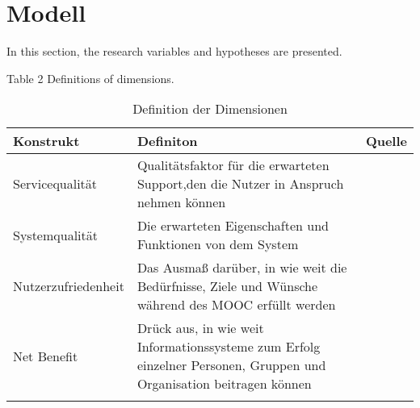 \section{Modell}
\label{sec:modell}

In this section, the research variables and hypotheses are presented.


Table 2
Definitions of dimensions.

\begin{table}[ht] 
\footnotesize
\caption{Definition der Dimensionen}
\label{tab:Dimensionen} 
\begin{tabular}{@{}lp{9cm}l@{}} \toprule

\textbf{Konstrukt} & \textbf{Definiton} & \textbf{Quelle} \\ \midrule



Servicequalität & Qualitätsfaktor für die erwarteten Support,den die Nutzer in Anspruch nehmen können & \parbox[t]{4cm}{\cite{petter2008measuring}}\\ 
Systemqualität & Die erwarteten Eigenschaften und Funktionen von dem System & \parbox[t]{4cm}{\cite{petter2008measuring}}\\ Nutzerzufriedenheit & Das Ausmaß darüber, in wie weit die Bedürfnisse, Ziele und Wünsche während des MOOC erfüllt werden & \parbox[t]{4cm}{\cite{sanchez2009moderating}}\\ 
Net Benefit & \parbox[t]{9cm}{Drück aus, in wie weit Informationssysteme zum Erfolg einzelner Personen, Gruppen und Organisation beitragen können}  & \parbox[t]{4cm}{\cite{conf/gi/GemlikNSB10} \cite{Petter:0aa} }\\ \addlinespace 
  \bottomrule

\end{tabular}	
\end{table}


